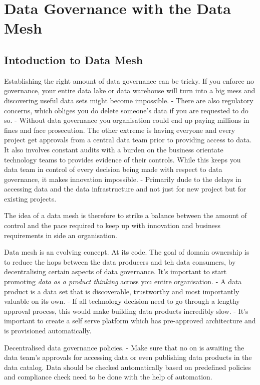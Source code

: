 \documentclass[a4paper, 11pt]{article}
\begin{document}
    \section{Data Governance with the Data Mesh}

    \subsection{Intoduction to Data Mesh}
    Establishing the right amount of data governance can be tricky.
    If you enforce no governance, your entire data lake or data warehouse will turn into a big mess and discovering useful data sets might become impossible.
    - There are also regulatory concerns, which obliges you do delete someone's data if you are requested to do so.
    - Without data governance you organisation could end up paying millions in fines and face prosecution.
    The other extreme is having everyone and every project get approvals from a central data team prior to providing access to data.
    It also involves constant audits with a burden on the business orientate technology teams to provides evidence of their controls.
    While this keeps you data team in control of every decision being made with respect to data governance, it makes innovation impossible.
    - Primarily dude to the delays in accessing data and the data infrastructure and not just for new project but for existing projects.

    The idea of a data mesh is therefore to strike a balance between the amount of control and the pace required to keep up with innovation and business requirements in side an organisation.

    Data mesh is an evolving concept.
    At its code.
    The goal of domain ownership is to reduce the hops between the data producers and teh data consumers, by decentralising certain aspects of data governance.
    It's important to start promoting \textit{data as a product thinking} across you entire organisation.
    - A data product is a data set that is discoverable, trustworthy and most importantly valuable on its own.
    - If all technology decision need to go through a lengthy approval process, this would make building data products incredibly slow.
    - It's important to create a self serve platform which has pre-approved architecture and is provisioned automatically.

    Decentralised data governance policies.
    - Make sure that no on is awaiting the data team's approvals for accessing data or even publishing data products in the data catalog.
    Data should be checked automatically based on predefined policies and compliance check need to be done with the help of automation.
\end{document}
